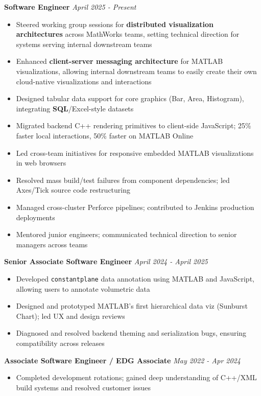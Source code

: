 \documentclass{article}
\begin{document}
{\large \textbf{Software Engineer}} \hfill \textit{April 2025 - Present}
\begin{itemize}[leftmargin=*]
    \item Steered working group sessions for \textbf{distributed visualization architectures} across MathWorks teams, setting technical direction for systems serving internal downstream teams
    \item Enhanced \textbf{client-server messaging architecture} for MATLAB visualizations, allowing internal downstream teams to easily create their own cloud-native visualizations and interactions
    \item Designed tabular data support for core graphics (Bar, Area, Histogram), integrating \textbf{SQL}/Excel-style datasets
    \item Migrated backend C++ rendering primitives to client-side JavaScript; 25\% faster local interactions, 50\% faster on MATLAB Online
    \item Led cross-team initiatives for responsive embedded MATLAB visualizations in web browsers
    \item Resolved mass build/test failures from component dependencies; led Axes/Tick source code restructuring
    \item Managed cross-cluster Perforce pipelines; contributed to Jenkins production deployments
    \item Mentored junior engineers; communicated technical direction to senior managers across teams
\end{itemize}

{\large \textbf{Senior Associate Software Engineer}} \hfill \textit{April 2024 - April 2025}
\begin{itemize}[leftmargin=*]
    \item Developed \texttt{constantplane} data annotation using MATLAB and JavaScript, allowing users to annotate volumetric data
    \item Designed and prototyped MATLAB's first hierarchical data viz (Sunburst Chart); led UX and design reviews
    \item Diagnosed and resolved backend theming and serialization bugs, ensuring compatibility across releases
\end{itemize}

{\large \textbf{Associate Software Engineer / EDG Associate}} \hfill \textit{May 2022 - Apr 2024}
\begin{itemize}[leftmargin=*]
    \item Completed development rotations; gained deep understanding of C++/XML build systems and resolved customer issues
\end{itemize}
\end{document}
